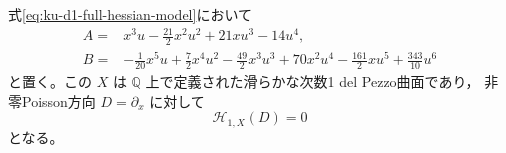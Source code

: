 \begin{proposition}[Hessian候補の零方向を持つ滑らかな曲面]
\label{prop:ku-d1-hessian-null-direction}
式\eqref{eq:ku-d1-full-hessian-model}において
\begin{equation}\label{eq:ku-d1-hessian-null-example}
 \begin{split}
 A={}&x^3u-\frac{21}{2}x^2u^2+21xu^3-14u^4,\\
 B={}&-\frac1{20}x^5u+\frac72x^4u^2-\frac{49}{2}x^3u^3
       +70x^2u^4-\frac{161}{2}xu^5+\frac{343}{10}u^6
 \end{split}
\end{equation}
と置く。この $X$ は $\mathbb Q$ 上で定義された滑らかな次数1 del Pezzo曲面であり，
非零Poisson方向 $D=\partial_x$ に対して
\[
                         \mathcal H_{1,X}(D)=0
\]
となる。
\end{proposition}

